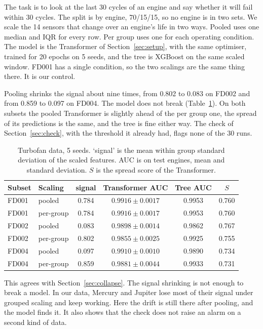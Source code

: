 \documentclass[preprint,12pt,authoryear]{elsarticle}
\begin{document}
The task is to look at the last 30 cycles of an engine and say whether it will fail within 30 cycles. The split is by engine, 70/15/15, so no engine is in two sets. We scale the 14 sensors that change over an engine's life in two ways. Pooled uses one median and IQR for every row. Per group uses one for each operating condition. The model is the Transformer of Section~\ref{sec:setup}, with the same optimiser, trained for 20 epochs on 5 seeds, and the tree is XGBoost on the same scaled window. FD001 has a single condition, so the two scalings are the same thing there. It is our control.

Pooling shrinks the signal about nine times, from 0.802 to 0.083 on FD002 and from 0.859 to 0.097 on FD004. The model does not break (Table~\ref{tab:cmapss}). On both subsets the pooled Transformer is slightly ahead of the per group one, the spread of its predictions is the same, and the tree is fine either way. The check of Section~\ref{sec:check}, with the threshold it already had, flags none of the 30 runs.

\begin{table}[t]
\centering
\caption{Turbofan data, 5 seeds. `signal' is the mean within group standard deviation of the scaled features. AUC is on test engines, mean and standard deviation. $S$ is the spread score of the Transformer.}
\label{tab:cmapss}
\footnotesize
\setlength{\tabcolsep}{4pt}
\begin{tabular}{@{}llcccc@{}}
\toprule
Subset & Scaling & signal & Transformer AUC & Tree AUC & $S$ \\
\midrule
FD001 & pooled & 0.784 & $0.9916 \pm 0.0017$ & 0.9953 & 0.760 \\
FD001 & per-group & 0.784 & $0.9916 \pm 0.0017$ & 0.9953 & 0.760 \\
FD002 & pooled & 0.083 & $0.9898 \pm 0.0014$ & 0.9862 & 0.767 \\
FD002 & per-group & 0.802 & $0.9855 \pm 0.0025$ & 0.9925 & 0.755 \\
FD004 & pooled & 0.097 & $0.9910 \pm 0.0010$ & 0.9890 & 0.734 \\
FD004 & per-group & 0.859 & $0.9881 \pm 0.0044$ & 0.9933 & 0.731 \\
\bottomrule
\end{tabular}
\end{table}

This agrees with Section~\ref{sec:collapse}. The signal shrinking is not enough to break a model. In our data, Mercury and Jupiter lose most of their signal under grouped scaling and keep working. Here the drift is still there after pooling, and the model finds it. It also shows that the check does not raise an alarm on a second kind of data.
\end{document}
